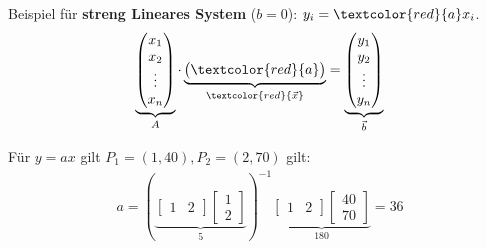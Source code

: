 \noindent
Beispiel für \textbf{streng Lineares System} ($b=0$): $y_i = \textcolor{red}{a}x_i$.
\[
\underbrace{\begin{pmatrix}
		x_1 \\
		x_2 \\
		\vdots \\
		x_n
\end{pmatrix}}_{\scriptsize{A}}
\cdot
\underbrace{\begin{pmatrix}
		\textcolor{red}{a}
\end{pmatrix}}_{\scriptsize{\textcolor{red}{\vec{x}}}}
=
\underbrace{\begin{pmatrix}
		y_1 \\
		y_2 \\
		\vdots \\
		y_n
\end{pmatrix}}_{\scriptsize{\vec{b}}}
\]

\noindent Für $y = ax$ gilt $P_1 = (1, 40), P_2 = (2,70)$ gilt:
\begin{align*}
	a = \left(\underbrace{\begin{bmatrix} 1 & 2 \end{bmatrix}\begin{bmatrix} 1 \\ 2 \end{bmatrix}}_{5}\right)^{-1}\underbrace{\begin{bmatrix} 1 & 2 \end{bmatrix}\begin{bmatrix} 40 \\ 70 \end{bmatrix}}_{180} = 36
\end{align*}